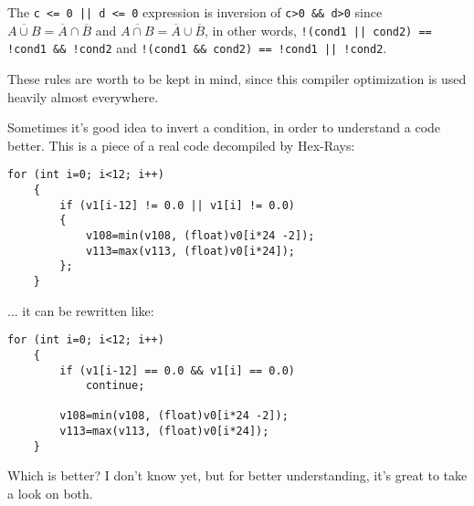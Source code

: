 The \verb~c <= 0 || d <= 0~ expression is inversion of \verb|c>0 && d>0| since 
$\overline{A \cup B} = \overline{A} \cap \overline{B}$ and
$\overline{A \cap B} = \overline{A} \cup \overline{B}$,
in other words,
\verb~!(cond1 || cond2) == !cond1 && !cond2~ and \verb~!(cond1 && cond2) == !cond1 || !cond2~.

These rules are worth to be kept in mind, since this compiler optimization is used heavily almost everywhere.

Sometimes it's good idea to invert a condition, in order to understand a code better.
This is a piece of a real code decompiled by Hex-Rays:

\begin{lstlisting}[style=customc]
	for (int i=0; i<12; i++)
	{
		if (v1[i-12] != 0.0 || v1[i] != 0.0)
		{
			v108=min(v108, (float)v0[i*24 -2]);
			v113=max(v113, (float)v0[i*24]);
		};
	}
\end{lstlisting}

... it can be rewritten like:

\begin{lstlisting}[style=customc]
	for (int i=0; i<12; i++)
	{
		if (v1[i-12] == 0.0 && v1[i] == 0.0)
			continue;

		v108=min(v108, (float)v0[i*24 -2]);
		v113=max(v113, (float)v0[i*24]);
	}
\end{lstlisting}

Which is better? I don't know yet, but for better understanding, it's great to take a look on both.

